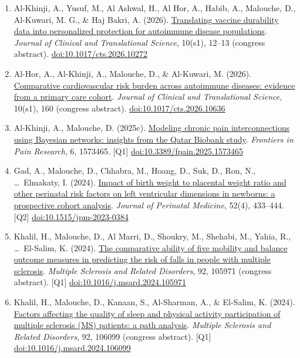 \documentclass[10pt,a4paper]{article}
\newcommand{\doi}[1]{\href{https://doi.org/#1}{doi:#1}}
\newcommand{\Qu}[1]{[Q#1]}
\begin{document}
\begin{enumerate}[resume*]
\item Al-Khinji, A., Yusuf, M., Al Ashwal, H., Al Hor, A., Habib, A., Malouche, D., Al-Kuwari, M. G., \& Haj Bakri, A. (2026). \href{https://doi.org/10.1017/cts.2026.10272}{Translating vaccine durability data into personalized protection for autoimmune disease populations}. \emph{Journal of Clinical and Translational Science}, 10(s1), 12--13 (congress abstract). \doi{10.1017/cts.2026.10272}
\item Al-Hor, A., Al-Khinji, A., Malouche, D., \& Al-Kuwari, M. (2026). \href{https://doi.org/10.1017/cts.2026.10636}{Comparative cardiovascular risk burden across autoimmune diseases: evidence from a primary care cohort}. \emph{Journal of Clinical and Translational Science}, 10(s1), 160 (congress abstract). \doi{10.1017/cts.2026.10636}
\item Al-Khinji, A., Malouche, D. (2025c). \href{https://doi.org/10.3389/fpain.2025.1573465}{Modeling chronic pain interconnections using Bayesian networks: insights from the Qatar Biobank study}. \emph{Frontiers in Pain Research}, 6, 1573465. \Qu1 \doi{10.3389/fpain.2025.1573465}
\item Gad, A., Malouche, D., Chhabra, M., Hoang, D., Suk, D., Ron, N., \ldots\ Elmakaty, I. (2024). \href{https://doi.org/10.1515/jpm-2023-0384}{Impact of birth weight to placental weight ratio and other perinatal risk factors on left ventricular dimensions in newborns: a prospective cohort analysis}. \emph{Journal of Perinatal Medicine}, 52(4), 433--444. \Qu2 \doi{10.1515/jpm-2023-0384}
\item Khalil, H., Malouche, D., Al Marri, D., Shoukry, M., Shehabi, M., Yahia, R., \ldots\ El-Salim, K. (2024). \href{https://doi.org/10.1016/j.msard.2024.105971}{The comparative ability of five mobility and balance outcome measures in predicting the risk of falls in people with multiple sclerosis}. \emph{Multiple Sclerosis and Related Disorders}, 92, 105971 (congress abstract). \Qu1 \doi{10.1016/j.msard.2024.105971}
\item Khalil, H., Malouche, D., Kanaan, S., Al-Sharman, A., \& El-Salim, K. (2024). \href{https://doi.org/10.1016/j.msard.2024.106099}{Factors affecting the quality of sleep and physical activity participation of multiple sclerosis (MS) patients: a path analysis}. \emph{Multiple Sclerosis and Related Disorders}, 92, 106099 (congress abstract). \Qu1 \doi{10.1016/j.msard.2024.106099}


\end{enumerate}
\end{document}
